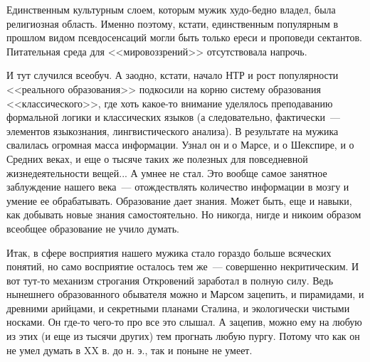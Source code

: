 \documentclass{scrbook}
\newcommand{\flqq}{<<}
\newcommand{\frqq}{>>}
\newcommand{\mdash}{~--- }
\begin{document}
Единственным культурным слоем, которым мужик худо-бедно владел, была религиозная область. Именно поэтому, кстати, единственным популярным в прошлом видом псевдосенсаций могли быть только ереси и проповеди сектантов. Питательная среда для {\flqq}мировоззрений{\frqq} отсутствовала напрочь.

И тут случился всеобуч. А заодно, кстати, начало НТР и рост популярности {\flqq}реального образования{\frqq} подкосили на корню систему образования {\flqq}классического{\frqq}, где хоть какое-то внимание уделялось преподаванию формальной логики и классических языков (а следовательно, фактически{\mdash}элементов языкознания, лингвистического анализа). В результате на мужика свалилась огромная масса информации. Узнал он и о Марсе, и о Шекспире, и о Средних веках, и еще о тысяче таких же полезных для повседневной жизнедеятельности вещей... А умнее не стал. Это вообще самое занятное заблуждение нашего века{\mdash}отождествлять количество информации в мозгу и умение ее обрабатывать. Образование дает знания. Может быть, еще и навыки, как добывать новые знания самостоятельно. Но никогда, нигде и никоим образом всеобщее образование не учило думать.

Итак, в сфере восприятия нашего мужика стало гораздо больше всяческих понятий, но само восприятие осталось тем же{\mdash}совершенно некритическим. И вот тут-то механизм строгания Откровений заработал в полную силу. Ведь нынешнего образованного обывателя можно и Марсом зацепить, и пирамидами, и древними арийцами, и секретными планами Сталина, и экологически чистыми носками. Он где-то чего-то про все это слышал. А зацепив, можно ему на любую из этих (и еще из тысячи других) тем прогнать любую пургу. Потому что как он не умел думать в XX в. до н. э., так и поныне не умеет.
\end{document}
